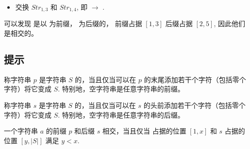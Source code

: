 \begin{itemize}
   \item 交换 $Str_{1, 3}$ 和 $Str_{1, 4}$, 即  $\rightarrow$ .
\end{itemize}

可以发现  是以  为前缀， 为后缀的， 前缀占据 $[1, 3]$ 后缀占据 $[2, 5]$, 因此他们是相交的。

\subsection{提示}

称字符串 $p$ 是字符串 $S$ 的，当且仅当可以在 $p$ 的末尾添加若干个字符（包括零个字符）将它变成 $S$. 特别地，空字符串是任意字符串的前缀。

称字符串 $s$ 是字符串 $S$ 的，当且仅当可以在 $s$ 的头前添加若干个字符（包括零个字符）将它变成 $S$. 特别地，空字符串是任意字符串的后缀。

一个字符串 $a$ 的前缀 $p$ 和后缀 $s$ 相交，当且仅当  占据的位置 $[1, x]$ 和 $s$ 占据的位置 $[y, |S|]$ 满足 $y < x$.
